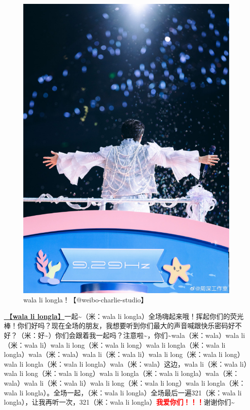 \documentclass[]{ctexbook}
\begin{document}
\begin{figure}

{\centering \includegraphics[width=400pt]{img/nanning20241207/005} 

}

\caption{wala li longla！【@weibo-charlie-studio】}\label{fig:unnamed-chunk-164}
\end{figure}

\hyperref[wala-li-longla]{🎵【\textbf{wala li longla}】}一起\textasciitilde（米：wala li longla）全场嗨起来哦！挥起你们的荧光棒！你们好吗？现在全场的朋友，我想要听到你们最大的声音喊跟快乐密码好不好？（米：好\textasciitilde）你们会跟着我一起吗？注意啦\textasciitilde，你们\textasciitilde wala（米：wala）wala li（米：wala li）wala li long（米：wala li long）wala li longla（米：wala li longla）wala（米：wala）wala li（米：wala li）wala li long（米：wala li long）wala li longla（米：wala li longla）wala（米：wala）这边，wala li（米：wala li）wala li long（米：wala li long）wala li longla（米：wala li longla）wala（米：wala）wala li（米：wala li）wala li long（米：wala li long）wala li longla（米：wala li longla）。全场一起，（米：wala li longla）全场最后一遍321（米：wala li longla），让我再听一次，321（米：wala li longla）\textbf{\textcolor{red}{我爱你们！！！}}谢谢你们\textasciitilde{}
\end{document}
